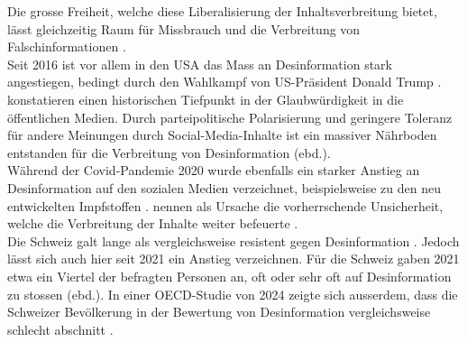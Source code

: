 \documentclass[12pt,a4paper]{article}        %
\begin{document}
Die grosse Freiheit, welche diese Liberalisierung der Inhaltsverbreitung bietet, lässt gleichzeitig Raum für Missbrauch und die Verbreitung von Falschinformationen \parencite[4]{ceron_fake_2021}.\\ 
Seit 2016 ist vor allem in den USA das Mass an Desinformation stark angestiegen, bedingt durch den Wahlkampf von US-Präsident Donald Trump \parencites[1094f]{lazer_science_2018}{allcott_social_2017}[147]{marx_fake_2020}[147]{tandoc_jr_defining_2018}. \textcite[1094f]{lazer_science_2018} konstatieren einen historischen Tiefpunkt in der Glaubwürdigkeit in die öffentlichen Medien. Durch parteipolitische Polarisierung und geringere Toleranz für andere Meinungen durch Social-Media-Inhalte ist ein massiver Nährboden entstanden für die Verbreitung von Desinformation (ebd.).\\
Während der Covid-Pandemie 2020 wurde ebenfalls ein starker Anstieg an Desinformation auf den sozialen Medien verzeichnet, beispielsweise zu den neu entwickelten Impfstoffen \parencite[2]{khan_fake_2021}. \Textcite[2]{ceron_fake_2021} nennen als Ursache die vorherrschende Unsicherheit, welche die Verbreitung der Inhalte weiter befeuerte \parencite[vgl.\ auch][22f]{zoglauer_konstruierte_2021}. \\

Die Schweiz galt lange als vergleichsweise resistent gegen Desinformation \parencite[26]{vogler_wahrnehmung_2021}. Jedoch lässt sich auch hier seit 2021 ein Anstieg verzeichnen. Für die Schweiz gaben 2021 etwa ein Viertel der befragten Personen an, oft oder sehr oft auf Desinformation zu stossen (ebd.). In einer OECD-Studie von 2024 zeigte sich ausserdem, dass die Schweizer Bevölkerung in der Bewertung von Desinformation vergleichsweise schlecht abschnitt \parencite{wyl_schweizerinnen_2024}.
\end{document}
